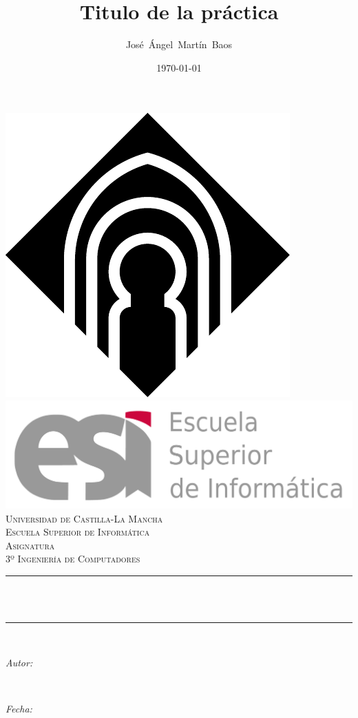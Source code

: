 \documentclass[11pt]{article}
\title{Titulo de la práctica}							%
\author{José~Ángel~Martín~Baos}							%
\date{\today}											%
\makeatletter
\let\thetitle\@title
\let\theauthor\@author
\let\thedate\@date
\makeatother
\begin{document}

\begin{titlepage}
	\centering
    \includegraphics[scale = 0.40]{uclm_logo.pdf}\\[1.0 cm]	%
    \includegraphics[scale = 0.25]{esi.pdf}\\[1.0 cm]
    \textsc{\LARGE Universidad de Castilla-La Mancha}\\[0.5 cm]	%
    \textsc{\LARGE Escuela Superior de Informática}\\[2.0 cm]
	\textsc{\Large Asignatura}\\[0.5 cm]				%
	\textsc{\large 3º Ingeniería de Computadores}\\[0.5 cm]						%
	\rule{\linewidth}{0.2 mm} \\[0.4 cm]
	{ \huge \bfseries \thetitle}\\
	\rule{\linewidth}{0.2 mm} \\[1.5 cm]
	
	\begin{minipage}{0.4\textwidth}
		\begin{flushleft} \large
			\emph{Autor:}\\
			\theauthor
			\end{flushleft}
			\end{minipage}~
			\begin{minipage}{0.4\textwidth}
			\begin{flushright} \large
			\emph{Fecha:} \\
			\thedate
		\end{flushright}
	\end{minipage}\\[1.5 cm]
 

\end{titlepage}
\end{document}
